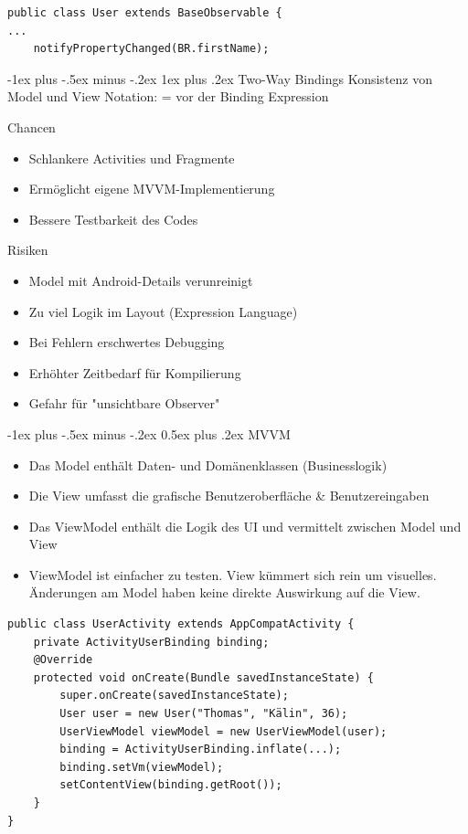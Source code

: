 \documentclass[10pt,landscape,a4paper]{article}
\makeatletter
\renewcommand{\section}{\@startsection{section}{1}{0mm}%
                                {-1ex plus -.5ex minus -.2ex}%
                                {0.5ex plus .2ex}%
                                {\normalfont\large\bfseries}}
\renewcommand{\subsubsection}{\@startsection{subsubsection}{3}{0mm}%
                                {-1ex plus -.5ex minus -.2ex}%
                                {1ex plus .2ex}%
                                {\normalfont\footnotesize\bfseries}}
\makeatother
\begin{document}
\begin{multicols*}{3}
\begin{verbatim}
public class User extends BaseObservable {
...
    notifyPropertyChanged(BR.firstName);
\end{verbatim}

\subsubsection{Two-Way Bindings}
Konsistenz von Model und View
Notation: = vor der Binding Expression

Chancen
\begin{itemize}[leftmargin=*]
\item{Schlankere Activities und Fragmente}
\item{Ermöglicht eigene MVVM-Implementierung}
\item{Bessere Testbarkeit des Codes}
\end{itemize}
Risiken
\begin{itemize}[leftmargin=*]
\item{Model mit Android-Details verunreinigt}
\item{Zu viel Logik im Layout (Expression Language)}
\item{Bei Fehlern erschwertes Debugging}
\item{Erhöhter Zeitbedarf für Kompilierung}
\item{Gefahr für "unsichtbare Observer"}
\end{itemize}

\section{MVVM}
\begin{itemize}[leftmargin=*]
\item{Das Model enthält Daten- und Domänenklassen (Businesslogik)}
\item{Die View umfasst die grafische Benutzeroberfläche \& Benutzereingaben}
\item{Das ViewModel enthält die Logik des UI und vermittelt zwischen Model und View}
\item{ViewModel ist einfacher zu testen. View kümmert sich rein um visuelles. Änderungen am Model haben keine direkte Auswirkung auf die View.}
\end{itemize}

\begin{verbatim}
public class UserActivity extends AppCompatActivity {
    private ActivityUserBinding binding;
    @Override
    protected void onCreate(Bundle savedInstanceState) {
        super.onCreate(savedInstanceState);
        User user = new User("Thomas", "Kälin", 36);
        UserViewModel viewModel = new UserViewModel(user);
        binding = ActivityUserBinding.inflate(...);
        binding.setVm(viewModel);
        setContentView(binding.getRoot());
    }
}


\end{verbatim}
\end{multicols*}
\end{document}
